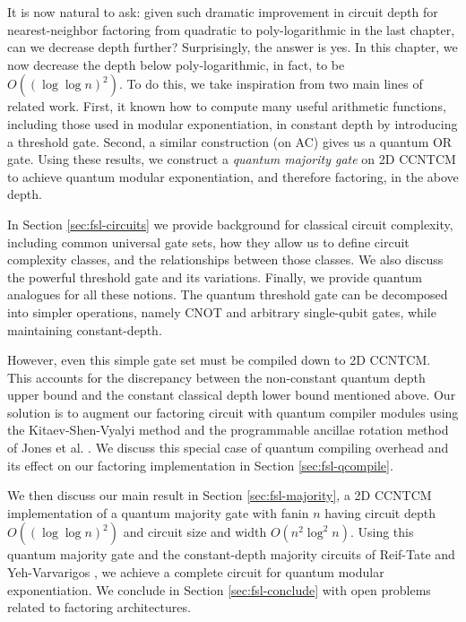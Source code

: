 It is now natural to ask: given such dramatic improvement in circuit depth
for nearest-neighbor factoring
from quadratic \cite{Kutin2006} to poly-logarithmic in the last chapter, can we
decrease depth further? Surprisingly, the answer is yes. In this
chapter, we now decrease the depth below poly-logarithmic, in fact,
to be $O((\log \log n)^2)$. To do this, we take inspiration from
two main lines of related work. First, it known how to compute
many useful arithmetic functions, including those used in modular
exponentiation, in constant depth by introducing a threshold gate.
Second, a similar construction (on \textsf{AC}) gives us a
quantum OR gate. Using these results,
we construct a \emph{quantum majority gate} on \textsf{2D CCNTCM} to
achieve quantum modular exponentiation, and therefore factoring, in the above
depth.

In Section \ref{sec:fsl-circuits} we provide background for classical circuit complexity,
including common universal gate sets, how they allow us to define circuit
complexity classes, and the relationships between those classes. We also
discuss the powerful threshold gate and its variations. Finally, we provide
quantum analogues for all these notions.
The quantum threshold
gate can be decomposed into simpler operations, namely CNOT and
arbitrary single-qubit gates, while maintaining constant-depth.

However,
even this simple gate set must be compiled down to \textsf{2D CCNTCM}.
This accounts for the discrepancy between the
non-constant quantum depth upper bound and the constant classical
depth lower bound mentioned above. Our solution is to augment our factoring circuit
with quantum compiler modules using the Kitaev-Shen-Vyalyi method \cite{Kitaev2002}
and the programmable ancillae rotation method of Jones et al. \cite{Jones2012}.
We discuss this special case of quantum
compiling overhead and its effect on our factoring implementation in
Section \ref{sec:fsl-qcompile}.

We then discuss our main result in Section \ref{sec:fsl-majority},
a \textsf{2D CCNTCM} implementation
of a quantum majority gate with fanin $n$ having circuit
depth $O((\log \log n)^2)$ and
circuit size and width $O(n^2\log^2 n)$. Using this quantum
majority gate and the constant-depth majority circuits of
Reif-Tate \cite{Reif1992} and Yeh-Varvarigos \cite{Yeh1996},
we achieve a complete circuit for quantum modular exponentiation.
We conclude in Section \ref{sec:fsl-conclude} with open problems
related to factoring architectures.